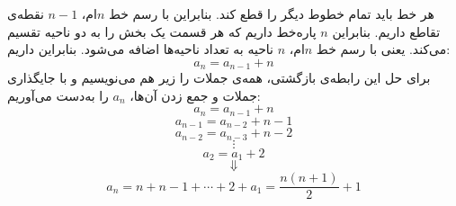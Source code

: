\p
هر خط باید تمام خطوط دیگر را قطع کند. بنابراین با رسم خط
$n$ام،
$n - 1$
نقطه‌ی تقاطع داریم. بنابراین
$n$
پاره‌خط داریم که هر قسمت یک بخش را به دو ناحیه تقسیم می‌کند. یعنی با رسم خط
$n$ام،
$n$
ناحیه به تعداد ناحیه‌ها اضافه می‌شود. بنابراین داریم:
$$a_n = a_{n-1} + n$$
برای حل این رابطه‌ی بازگشتی، همه‌ی جملات را زیر هم می‌نویسیم و با جایگذاری جملات و جمع زدن آن‌ها،
$a_n$
را به‌دست می‌آوریم:
$$a_n = a_{n-1} + n$$
$$a_{n-1} = a_{n-2} + n - 1$$
$$a_{n-2} = a_{n-3} + n - 2$$
$$\vdots$$
$$a_{2} = a_1 + 2$$
$$\Downarrow$$
$$a_n = n + n - 1 + \cdots + 2 + a_1 = \frac{n(n + 1)}{2} + 1$$